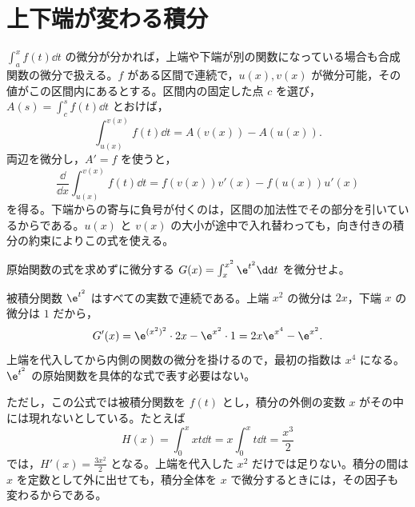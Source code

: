 \section{上下端が変わる積分}\label{節:変数上下端}
$\int_a^x f(t)\dd t$ の微分が分かれば，上端や下端が別の関数になっている場合も合成関数の微分で扱える。$f$ がある区間で連続で，$u(x),v(x)$ が微分可能，その値がこの区間内にあるとする。区間内の固定した点 $c$ を選び，$A(s)=\int_c^s f(t)\dd t$ とおけば，
\[
 \int_{u(x)}^{v(x)}f(t)\dd t=A(v(x))-A(u(x)).
\]
両辺を微分し，$A'=f$ を使うと，
\[
 \boxed{\frac{\dd}{\dd x}\int_{u(x)}^{v(x)}f(t)\dd t
 =f(v(x))v'(x)-f(u(x))u'(x)}
\]
を得る。下端からの寄与に負号が付くのは，区間の加法性でその部分を引いているからである。$u(x)$ と $v(x)$ の大小が途中で入れ替わっても，向き付きの積分の約束によりこの式を使える。

\begin{example}{原始関数の式を求めずに微分する}
$G(x)=\int_x^{x^2}\e^{t^2}\dd t$ を微分せよ。
\end{example}
被積分関数 $\e^{t^2}$ はすべての実数で連続である。上端 $x^2$ の微分は $2x$，下端 $x$ の微分は $1$ だから，
\[
 G'(x)=\e^{(x^2)^2}\cdot2x-\e^{x^2}\cdot1
       =2x\e^{x^4}-\e^{x^2}.
\]
上端を代入してから内側の関数の微分を掛けるので，最初の指数は $x^4$ になる。$\e^{t^2}$ の原始関数を具体的な式で表す必要はない。

ただし，この公式では被積分関数を $f(t)$ とし，積分の外側の変数 $x$ がその中には現れないとしている。たとえば
\[
 H(x)=\int_0^x xt\dd t
      =x\int_0^x t\dd t=\frac{x^3}{2}
\]
では，$H'(x)=\frac{3x^2}{2}$ となる。上端を代入した $x^2$ だけでは足りない。積分の間は $x$ を定数として外に出せても，積分全体を $x$ で微分するときには，その因子も変わるからである。


